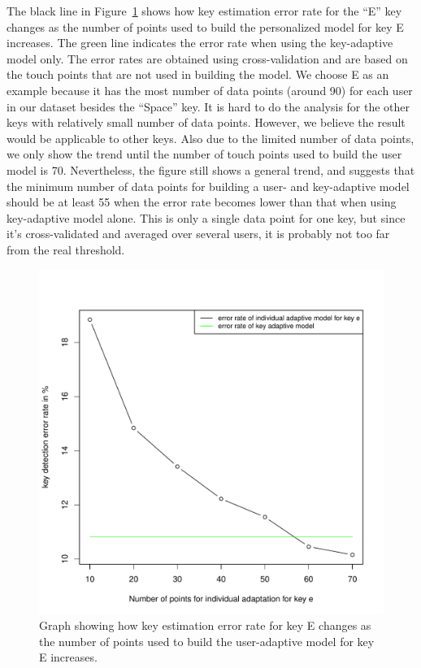 \documentclass{sigchi}
\begin{document}
The black line in Figure~\ref{fig:user-adapt} shows how key estimation error rate for the ``E'' key
changes as the number of points used to build
the personalized model for key E increases. The green line indicates the error rate when using the key-adaptive model only. The error rates are obtained using cross-validation
and are based on the touch points that are not used in building the
model. We choose E as an
example because it has the most number of data points (around 90) for each
user in our dataset besides the ``Space'' key. It is hard to do the analysis for the other keys with
relatively small number of data points. However, we believe the result would be applicable to other
keys. Also due to the limited number
of data points, we only show the trend until the number of touch points used to build the user
model is 70. Nevertheless, the figure still shows a general trend, and suggests
that the minimum number of data points for building a user- and key-adaptive model
should be at least 55 when the error rate becomes lower than that when using key-adaptive model alone. This is only a single data point for one key, but since it's cross-validated and averaged over several users, it is probably not too far from the real threshold.

\begin{figure}[tb]
 \centering
 \includegraphics[width=0.9\columnwidth]{figures/individual-adapt.pdf}
 \caption{Graph showing how key estimation error rate for key E changes as the number of
 points used to build the user-adaptive model for key E increases.}
 \label{fig:user-adapt}
\end{figure}
\end{document}
